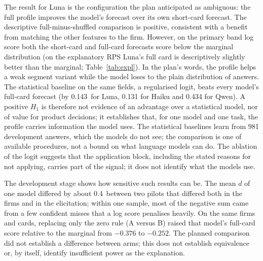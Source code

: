 \documentclass[11pt]{article}
\newcommand{\nats}{\,\text{nats}}
\begin{document}
The result for Luna is the configuration the plan anticipated as ambiguous: the full profile improves the model's
forecast over its own short-card forecast. The descriptive full-minus-shuffled comparison is positive, consistent
with a benefit from matching the other features to the firm. However, on the primary band log score both the
short-card and full-card forecasts score below the marginal distribution (on the explanatory RPS Luna's full card is
descriptively slightly better than the marginal; Table~\ref{tab:expl}). In the plan's words, the
profile helps a weak segment variant while the model loses to the plain distribution of answers. The statistical
baseline on the same fields, a regularised logit, beats every model's full-card forecast (by 0.143\nats{} for Luna,
0.131 for Haiku and 0.434 for Qwen). A positive $H_1$ is therefore
not evidence of an advantage over a statistical model, nor of value for product decisions; it establishes that, for
one model and one task, the profile carries information the model uses. The statistical baselines learn from 981
development answers, which the models do not see; the comparison is one of available procedures, not a bound on what
language models can do. The ablation of the logit suggests that the application block, including the stated reasons
for not applying, carries part of the signal; it does not identify what the models use.

The development stage shows how sensitive such results can be. The mean $d$ of one model differed by about
0.4\nats{} between two pilots that differed both in the firms and in the elicitation; within one sample, most of the
negative sum came from a few confident misses that a log score penalises heavily. On the same firms and cards,
replacing only the zero rule (A versus B) raised that model's full-card score relative to the marginal from $-0.376$ to
$-0.252$. The planned comparison did not establish a difference between arms; this does not establish equivalence
or, by itself, identify insufficient power as the explanation.
\end{document}
